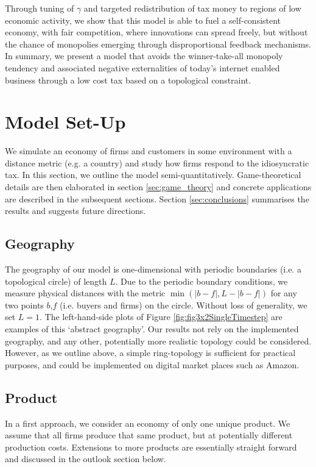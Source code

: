 \documentclass[final,3p,times,authoryear,12pt]{elsarticle}
\begin{document}
Through tuning of $\gamma$ and targeted redistribution of tax money to regions of low economic activity, we show that this model is able to fuel a self-consistent economy, 
with fair competition, where innovations can spread freely, but without the chance of monopolies emerging through disproportional feedback mechanisms. 
In summary, we present a model that avoids the winner-take-all monopoly tendency and associated negative externalities of today's internet enabled business through a low cost tax based on a topological constraint. 


\section{Model Set-Up}

We simulate an economy of firms and customers in some environment with a distance metric (e.g. a country) and study how firms respond to the idiosyncratic tax.
In this section, we outline the model semi-quantitatively. 
Game-theoretical details are then elaborated in section \ref{sec:game_theory} and concrete applications are described in the subsequent sections. 
Section \ref{sec:conclusions} summarises the results and suggests future directions. 

\subsection{Geography}
The geography of our model is one-dimensional with periodic boundaries (i.e. a topological circle) of length $L$. 
Due to the periodic boundary conditions, we measure physical distances with the metric $\min(|b-f|, L-|b-f|)$ for any two points $b$,$f$ (i.e. buyers and firms) on the circle. 
Without loss of generality, we set $L=1$. 
The left-hand-side plots of Figure \ref{fig:fig3x2SingleTimestep} are examples of this `abstract geography'.
Our results not rely on the implemented geography, and any other, potentially more realistic topology could be considered.
However, as we outline above, a simple ring-topology is sufficient for practical purposes, and could be implemented on digital market places such as Amazon. 

\subsection{Product}
In a first approach, we consider an economy of only one unique product. 
We assume that all firms produce that same product, but at potentially different production costs. 
Extensions to more products are essentially straight forward and discussed in the outlook section below. 
\end{document}
